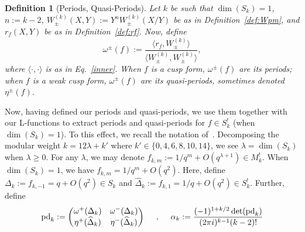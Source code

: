 \documentclass[11pt]{article}
\newtheorem{definition}[theorem]{Definition}
\newcommand{\Dhat}{\widehat{\Delta}}
\begin{document}
\begin{definition}[Periods, Quasi-Periods]\label{def:periods}
Let $k$ be such that $\dim(S_k) = 1$, $n:= k-2$, $W^{(k)}_\pm(X, Y) := Y^n W^{(k)}_\pm(X/Y)$ be as in Definition~\ref{def:Wpm}, and $r_f(X, Y)$ be as in Definition~\ref{def:rf}. Now, define 
\begin{equation}\label{eq:project}
\omega^\pm(f):=\frac{\langle r_f,W^{(k)}_\pm\rangle}{\langle W^{(k)}_\pm,W^{(k)}_\pm\rangle},
\end{equation}
where $\langle\cdot,\cdot\rangle$ is as in Eq.~\eqref{inner}. When $f$ is a cusp form, $\omega^\pm(f)$ are its {\em periods}; when $f$ is a weak cusp form, $\omega^\pm(f)$ are its {\em quasi-periods}, sometimes denoted $\eta^\pm(f)$.
\end{definition}
Now, having defined our periods and quasi-periods, we use them together with our L-functions 
to extract periods and quasi-periods for $f \in S_k^!$ (when $\dim(S_k) = 1$). To this effect, 
we recall the notation of~\cite{DukeJenkins}. Decomposing the modular weight 
$k = 12 \lambda + k'$ where $k' \in \{ 0, 4, 6, 8, 10, 14\}$, we see $\lambda = \dim(S_k)$ when 
$\lambda \geq 0$. For any $\lambda$, we may denote $f_{k, m} := 1/q^m + O(q^{\lambda+1}) \in M_k^!$. 
When $\dim(S_k) = 1$, we have $f_{k,m} = 1/q^m + O(q^2)$. Here, define 
$\Delta_k := f_{k,-1} = q + O(q^2) \in S_k$ and $\Dhat_k := f_{k,1} = 1/q + O(q^2) \in S_k^!$.
Further, define
\begin{align}
{\rm pd}_k := \left( \begin{matrix} 
\omega^+(\Delta_k) & \omega^-(\Delta_k) \\
\eta^+(\Dhat_k) & \eta^-(\Dhat_k)
\end{matrix}\right) ~~~~,~~~~
\alpha_k := \frac{(-1)^{1+k/2} \det({\rm pd}_k)}{(2\pi i)^{k-1}(k-2)!}
\end{align}
\end{document}

